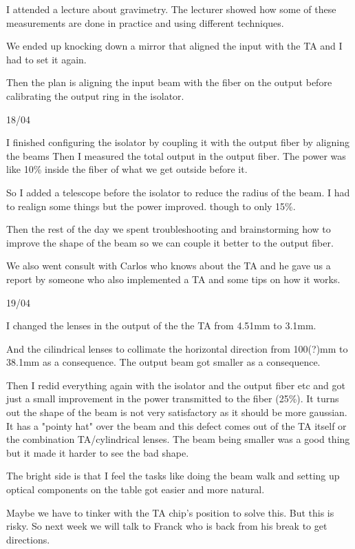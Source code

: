 I attended a lecture about gravimetry. The lecturer showed how some of these measurements are done in practice and using different techniques.

We ended up knocking down a mirror that aligned the input with the TA and I had to set it again.

Then the plan is aligning the input beam with the fiber on the output before calibrating the output ring in the isolator.

18/04

I finished configuring the isolator by coupling it with the output fiber by aligning the beams
Then I measured the  total output in the output fiber. The power was like 10\% inside the fiber of what we get outside before it. 

So I added a telescope before the isolator to reduce the radius of the beam. I had to realign some things but the power improved. though to only 15\%.

Then the rest of the day we spent troubleshooting and brainstorming how to improve the shape of the beam so we can couple it better to the output fiber.

We also went consult with Carlos who knows about the TA and he gave us a report by someone who also implemented a TA and some tips on how it works.

19/04

I changed the lenses in the output of the the TA from 4.51mm to 3.1mm.

And the cilindrical lenses to collimate the horizontal direction from 100(?)mm to 38.1mm as a consequence. The output beam got smaller as a consequence.

Then I redid everything again with the isolator and the output fiber etc and got just a small improvement in the power transmitted to the fiber (25\%). It turns out the shape of the beam is not very satisfactory as it should be more gaussian. It has a "pointy hat" over the beam and this defect comes out of the TA itself or the combination TA/cylindrical lenses. The beam being smaller was a good thing but it made it harder to see the bad shape.

The bright side is that I feel the tasks like doing the beam walk and setting up optical components on the table got easier and more natural.

Maybe we have to tinker with the TA chip's position to solve this. But this is risky. So next week we will talk to Franck who is back from his break to get directions. 

